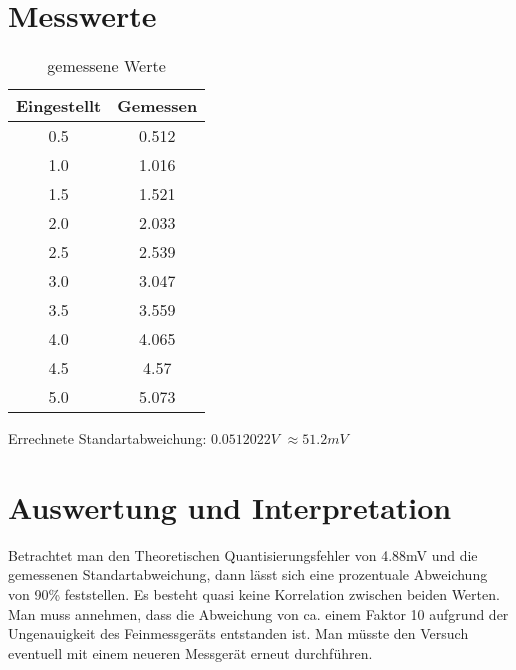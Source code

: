 \section{Messwerte}
\label{chap:VERSUCH_3_MESSWERTE}

\begin{table}[H]
\begin{tabular}{c|c}
Eingestellt & Gemessen \\
\hline
0.5 & 0.512 \\
1.0 & 1.016 \\ 
1.5 & 1.521 \\ 
2.0 & 2.033 \\ 
2.5 & 2.539\\
3.0 & 3.047\\
3.5 & 3.559\\
4.0 & 4.065\\
4.5 & 4.57\\
5.0 & 5.073\\
\end{tabular} 
\centering
\caption{gemessene Werte}
\label{TABLE:VERSUCH3}
\end{table}

Errechnete Standartabweichung: $0.0512022 V$ $ \approx 51.2 mV$

\section{Auswertung und Interpretation}
\label{chap:VERSUCH_3_AUSWERTUNG}
Betrachtet man den Theoretischen Quantisierungsfehler von 4.88mV und die gemessenen Standartabweichung, dann lässt sich eine prozentuale Abweichung von 90\% feststellen.
Es besteht quasi keine Korrelation zwischen beiden Werten. Man muss annehmen, dass die Abweichung von ca. einem Faktor 10 aufgrund der Ungenauigkeit des Feinmessgeräts entstanden ist. Man müsste den Versuch eventuell mit einem neueren Messgerät erneut durchführen. 